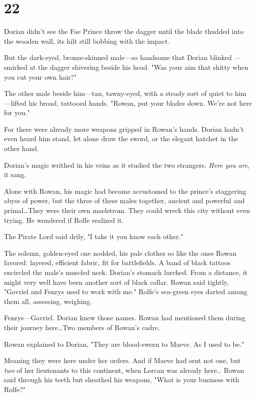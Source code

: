 
\chapter{22}

Dorian didn't see the Fae Prince throw the dagger until the blade thudded into the wooden wall, its hilt still bobbing with the impact.

But the dark-eyed, bronze-skinned male---so handsome that Dorian blinked ---smirked at the dagger shivering beside his head.
"Was your aim that shitty when you cut your own hair?"

The other male beside him---tan, tawny-eyed, with a steady sort of quiet to him---lifted his broad, tattooed hands.
"Rowan, put your blades down.
We're not here for you."

For there were already more weapons gripped in Rowan's hands.
Dorian hadn't even heard him stand, let alone draw the sword, or the elegant hatchet in the other hand.

Dorian's magic writhed in his veins as it studied the two strangers.
\emph{Here you are}, it sang.

Alone with Rowan, his magic had become accustomed to the prince's staggering abyss of power, but the three of these males together, ancient and powerful and primal\ldots They were their own maelstrom.
They could wreck this city without even trying.
He wondered if Rolfe realized it.

The Pirate Lord said drily, "I take it you know each other."

The solemn, golden-eyed one nodded, his pale clothes so like the ones Rowan favored: layered, efficient fabric, fit for battlefields.
A band of black tattoos encircled the male's muscled neck.
Dorian's stomach lurched.
From a distance, it might very well have been another sort of black collar.
Rowan said tightly, "Gavriel and Fenrys used to 
work with me."
Rolfe's sea-green eyes darted among them all, assessing, weighing.

Fenrys---Gavriel.
Dorian knew those names.
Rowan had mentioned them during their journey here\ldots Two members of Rowan's cadre.

Rowan explained to Dorian, "They are blood-sworn to Maeve.
As I used to be."

Meaning they were here under her orders.
And if Maeve had sent not one, but \emph{two} of her lieutenants to this continent, when Lorcan was already here\ldots{} Rowan said through his teeth but sheathed his weapons, "What is your business with Rolfe?"

